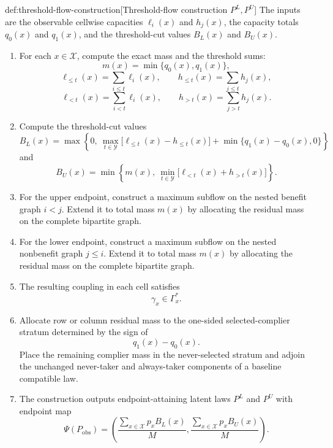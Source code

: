 \documentclass[11pt]{article}
\begin{document}
\begin{algorithmv}{def:threshold-flow-construction}[Threshold-flow construction \(P^L,P^U\)]
The inputs are the observable cellwise capacities \(\ell_i(x)\) and \(h_j(x)\), the capacity totals \(q_0(x)\) and \(q_1(x)\), and the threshold-cut values \(B_L(x)\) and \(B_U(x)\).

\begin{enumerate}
\item For each \(x\in\mathcal X\), compute the exact mass and the threshold sums:
\[
m(x)=\min\{q_0(x),q_1(x)\},
\]
\[
\ell_{\le t}(x)=\sum_{i\le t}\ell_i(x),
\qquad
h_{\le t}(x)=\sum_{j\le t}h_j(x),
\]
\[
\ell_{<t}(x)=\sum_{i<t}\ell_i(x),
\qquad
h_{>t}(x)=\sum_{j>t}h_j(x).
\]

\item Compute the threshold-cut values
\[
B_L(x)
=
\max\left\{
0,\
\max_{t\in\mathcal Y}\bigl[\ell_{\le t}(x)-h_{\le t}(x)\bigr]
+\min\{q_1(x)-q_0(x),0\}
\right\}
\]
and
\[
B_U(x)
=
\min\left\{
m(x),\
\min_{t\in\mathcal Y}\bigl[\ell_{<t}(x)+h_{>t}(x)\bigr]
\right\}.
\]

\item For the upper endpoint, construct a maximum subflow on the nested benefit graph \(i<j\). Extend it to total mass \(m(x)\) by allocating the residual mass on the complete bipartite graph.

\item For the lower endpoint, construct a maximum subflow on the nested nonbenefit graph \(j\le i\). Extend it to total mass \(m(x)\) by allocating the residual mass on the complete bipartite graph.

\item The resulting coupling in each cell satisfies
\[
\gamma_x\in\Gamma_x^{\ast}.
\]

\item Allocate row or column residual mass to the one-sided selected-complier stratum determined by the sign of
\[
q_1(x)-q_0(x).
\]
Place the remaining complier mass in the never-selected stratum and adjoin the unchanged never-taker and always-taker components of a baseline compatible law.

\item The construction outputs endpoint-attaining latent laws \(P^L\) and \(P^U\) with endpoint map
\[
\Psi(P_{\mathrm{obs}})
=
\left(
\frac{\sum_{x\in\mathcal X}p_xB_L(x)}{M},
\frac{\sum_{x\in\mathcal X}p_xB_U(x)}{M}
\right).
\]
\end{enumerate}
\end{algorithmv}
\end{document}
